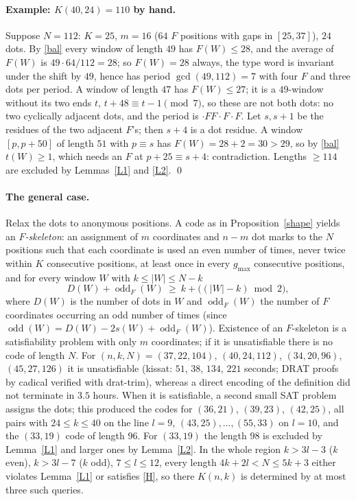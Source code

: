 \documentclass[11pt]{article}
\theoremstyle{remark}
\newcommand{\odd}{\operatorname{odd}}
\begin{document}
\paragraph{Example: $K(40,24)=110$ by hand.} Suppose $N=112$: $K=25$, $m=16$ ($64$ $F$ positions with gaps in $[25,37]$), $24$ dots.
By \eqref{bal} every window of length $49$ has $F(W)\le 28$, and the average of $F(W)$ is $49\cdot 64/112=28$; so $F(W)=28$ always,
the type word is invariant under the shift by $49$, hence has period $\gcd(49,112)=7$ with four $F$ and three dots per period.
A window of length $47$ has $F(W)\le 27$; it is a $49$-window without its two ends $t$, $t+48\equiv t-1 \pmod 7$, so these are not
both dots: no two cyclically adjacent dots, and the period is $\cdot FF\cdot F\cdot F$. Let $s,s+1$ be the residues of the two
adjacent $F$'s; then $s+4$ is a dot residue. A window $[p,p+50]$ of length $51$ with $p\equiv s$ has $F(W)=28+2=30>29$, so by
\eqref{bal} $t(W)\ge1$, which needs an $F$ at $p+25\equiv s+4$: contradiction. Lengths $\ge 114$ are excluded by Lemmas~\ref{L1} and \ref{L2}. \qed

\paragraph{The general case.} Relax the dots to anonymous positions. A code as in Proposition~\ref{shape} yields an
\emph{$F$-skeleton}: an assignment of $m$ coordinates and $n-m$ dot marks to the $N$ positions such that each coordinate is used an
even number of times, never twice within $K$ consecutive positions, at least once in every $g_{\max}$ consecutive positions, and
for every window $W$ with $k\le |W|\le N-k$
\[ D(W)+\odd_F(W)\ \ge\ k+\bigl((|W|-k)\bmod 2\bigr), \]
where $D(W)$ is the number of dots in $W$ and $\odd_F(W)$ the number of $F$ coordinates occurring an odd number of times
(since $\odd(W)=D(W)-2s(W)+\odd_F(W)$). Existence of an $F$-skeleton is a satisfiability problem with only $m$ coordinates;
if it is unsatisfiable there is no code of length $N$. For $(n,k,N)=(37,22,104)$, $(40,24,112)$, $(34,20,96)$, $(45,27,126)$ it is
unsatisfiable (kissat: $51$, $38$, $134$, $221$ seconds; DRAT proofs by cadical verified with drat-trim), whereas a direct encoding of
the definition did not terminate in $3.5$ hours. When it is satisfiable, a second small SAT problem assigns the dots; this produced
the codes for $(36,21)$, $(39,23)$, $(42,25)$, all pairs with $24\le k\le 40$ on the line $l=9$, $(43,25),\dots,(55,33)$ on $l=10$, and the
$(33,19)$ code of length $96$. For $(33,19)$ the length $98$ is excluded by Lemma~\ref{L1} and larger ones by Lemma~\ref{L2}.
In the whole region $k>3l-3$ ($k$ even), $k>3l-7$ ($k$ odd), $7\le l\le 12$, every length $4k+2l<N\le 5k+3$ either violates
Lemma~\ref{L1} or satisfies \eqref{H}, so there $K(n,k)$ is determined by at most three such queries.
\end{document}
